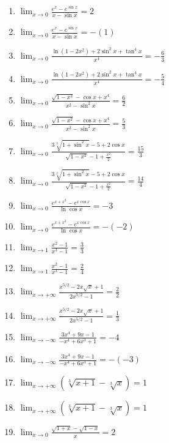 \documentclass[11pt,a4paper]{article}
\begin{document}
\begin{enumerate}
\item $\displaystyle \lim_{x \to 0} \frac{e^{x} - e^{\sin x}}{x - \sin x} = 2$
\item $\displaystyle \lim_{x \to 0} \frac{e^{x} - e^{\sin x}}{x - \sin x} = -\left(1\right)$
\item $\displaystyle \lim_{x \to 0} \frac{\ln(1 - 2x^{2}) + 2\sin^{2} x + \tan^{4} x}{x^{4}} = -\frac{6}{3}$
\item $\displaystyle \lim_{x \to 0} \frac{\ln(1 - 2x^{2}) + 2\sin^{2} x + \tan^{4} x}{x^{4}} = -\frac{5}{4}$
\item $\displaystyle \lim_{x \to 0} \frac{\sqrt{1 - x^{2}} - \cos x + x^{4}}{x^{2} - \sin^{2} x} = \frac{6}{2}$
\item $\displaystyle \lim_{x \to 0} \frac{\sqrt{1 - x^{2}} - \cos x + x^{4}}{x^{2} - \sin^{2} x} = \frac{5}{3}$
\item $\displaystyle \lim_{x \to 0} \frac{3\sqrt[3]{1 + \sin^{2} x} - 5 + 2\cos x}{\sqrt{1 - x^{2}} - 1 + \frac{x^{2}}{2}} = \frac{15}{3}$
\item $\displaystyle \lim_{x \to 0} \frac{3\sqrt[3]{1 + \sin^{2} x} - 5 + 2\cos x}{\sqrt{1 - x^{2}} - 1 + \frac{x^{2}}{2}} = \frac{14}{4}$
\item $\displaystyle \lim_{x \to 0} \frac{e^{x + x^{2}} - e^{x\cos x}}{\ln\cos x} = -3$
\item $\displaystyle \lim_{x \to 0} \frac{e^{x + x^{2}} - e^{x\cos x}}{\ln\cos x} = -\left(-2\right)$
\item $\displaystyle \lim_{x \to 1} \frac{x^{2} - 1}{x^{3} - 1} = \frac{3}{3}$
\item $\displaystyle \lim_{x \to 1} \frac{x^{2} - 1}{x^{3} - 1} = \frac{2}{4}$
\item $\displaystyle \lim_{x \to +\infty} \frac{x^{5/2} - 2x\sqrt{x} + 1}{2x^{5/2} - 1} = \frac{2}{2}$
\item $\displaystyle \lim_{x \to +\infty} \frac{x^{5/2} - 2x\sqrt{x} + 1}{2x^{5/2} - 1} = \frac{1}{3}$
\item $\displaystyle \lim_{x \to -\infty} \frac{3x^{4} + 9x - 1}{-x^{4} + 6x^{3} + 1} = -4$
\item $\displaystyle \lim_{x \to -\infty} \frac{3x^{4} + 9x - 1}{-x^{4} + 6x^{3} + 1} = -\left(-3\right)$
\item $\displaystyle \lim_{x \to +\infty} \left(\sqrt[3]{x + 1} - \sqrt[3]{x}\right) = 1$
\item $\displaystyle \lim_{x \to +\infty} \left(\sqrt[3]{x + 1} - \sqrt[3]{x}\right) = 1$
\item $\displaystyle \lim_{x \to 0} \frac{\sqrt{1 + x} - \sqrt{1 - x}}{x} = 2$

\end{enumerate}
\end{document}
